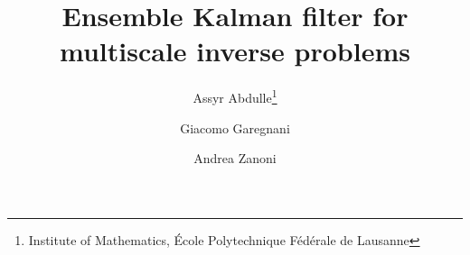 \usepackage[T1]{fontenc}
\usepackage{lmodern}
\usepackage[utf8x]{inputenx}
\usepackage{microtype}
\usepackage{framed}
\usepackage{listings}
\usepackage{vmargin}
\usepackage{setspace}
\usepackage{mathrsfs, mathenv}
\usepackage{amsmath, amsthm, amssymb, amsfonts, amscd}
\usepackage{graphicx}
\usepackage{epstopdf}
\usepackage[svgnames]{xcolor}
\usepackage{hyperref}
\hypersetup{citecolor=blue, colorlinks=true, linkcolor=black}
\setlength{\parskip}{6pt}
\setlength\parindent{0pt}
\usepackage{subcaption}
\usepackage{bbm}
\usepackage{cite}
\usepackage{verbatim}
\usepackage{pgfplots}
\usepackage{tikz}
\usepackage{etoolbox}
\usepackage{color}
\usepackage{lipsum}
\usepackage{ifthen}
\usepackage[linesnumbered, ruled, vlined]{algorithm2e}

\theoremstyle{plain}
\newtheorem{theorem}{Theorem}
\newtheorem{corollary}{Corollary}
\newtheorem{lemma}{Lemma}
\newtheorem{proposition}{Proposition}

\theoremstyle{definition}
\newtheorem{definition}{Definition}

\theoremstyle{remark}
\newtheorem{remark}{Remark}
\newtheorem{assumption}{Assumption}
\newtheorem{example}{Example}


\ifpdf
\else
\fi

\usepackage{mathtools}


\usepackage{booktabs}

\usepackage{pgfplots}
\usepackage{tikz}
\usetikzlibrary{patterns,arrows,decorations.pathmorphing,backgrounds,positioning,fit,matrix}
\usepackage[labelfont=bf]{caption}
\setlength{\belowcaptionskip}{-5pt}
\usepackage{here}
\usepackage[font=normal]{subcaption}

\usepackage{enumitem}

\newcommand{\creflastconjunction}{, and~}


\newcommand{\email}[1]{\href{#1}{#1}}
\newcommand{\TheTitle}{Ensemble Kalman filter for multiscale inverse problems} 
\newcommand{\TheAuthors}{A. Abdulle, G. Garegnani}
\title{{\TheTitle}}
\newcommand*\samethanks[1][\value{footnote}]{\footnotemark[#1]}
\author{Assyr Abdulle\thanks{Institute of Mathematics, \'Ecole Polytechnique F\'ed\'erale de Lausanne}
	\and
	Giacomo Garegnani\samethanks
	\and 
	Andrea Zanoni\samethanks
	}
\date{}

